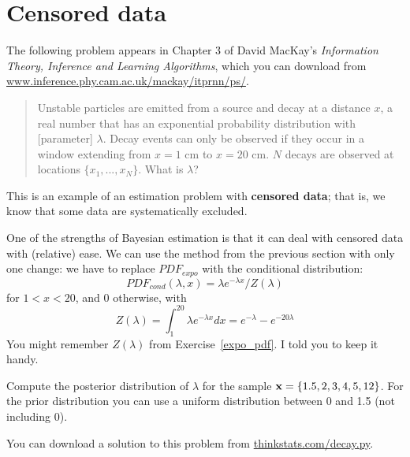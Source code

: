 \documentclass[12pt]{book}
\begin{document}





\section{Censored data}
\label{censored}


The following problem appears in Chapter 3 of David MacKay's
{\em Information Theory, Inference and Learning
  Algorithms}, which you can download from
\url{www.inference.phy.cam.ac.uk/mackay/itprnn/ps/}.

\begin{quote}


Unstable particles are emitted from a source and decay at a distance
$x$, a real number that has an exponential probability distribution
with [parameter] $\lambda$.  Decay events can
only be observed if they occur in a window extending from $x=1$ cm to
$x=20$ cm.  $N$ decays are observed at locations $\{ x_1, ... , x_N
\}$.  What is $\lambda$?

\end{quote}

This is an example of an estimation problem with {\bf censored data};
that is, we know that some data are systematically excluded.

One of the strengths of Bayesian estimation is that it can deal with
censored data with (relative) ease.  We can use the method from the
previous section with only one change: we have to replace
$PDF_{expo}$ with the conditional distribution:
%
\[ PDF_{cond}(\lambda, x) = \lambda e^{-\lambda x} / Z(\lambda)  \]
%
for $1 < x < 20$, and 0 otherwise, with
%
\[ Z(\lambda) = \int_1^{20} \lambda e^{-\lambda x} dx = 
e^{-\lambda} - e^{-20 \lambda}  \]
%
You might remember $Z(\lambda)$ from Exercise~\ref{expo_pdf}.  I told
you to keep it handy.

\begin{ex}

Compute the posterior distribution of $\lambda$ for the sample
$\mathbf{x} = \{ 1.5, 2, 3, 4, 5, 12 \}$.  For the prior distribution you
can use a uniform distribution between 0 and 1.5 (not including 0).

You can download a solution to this problem from
\url{thinkstats.com/decay.py}.

\end{ex}
\end{document}
